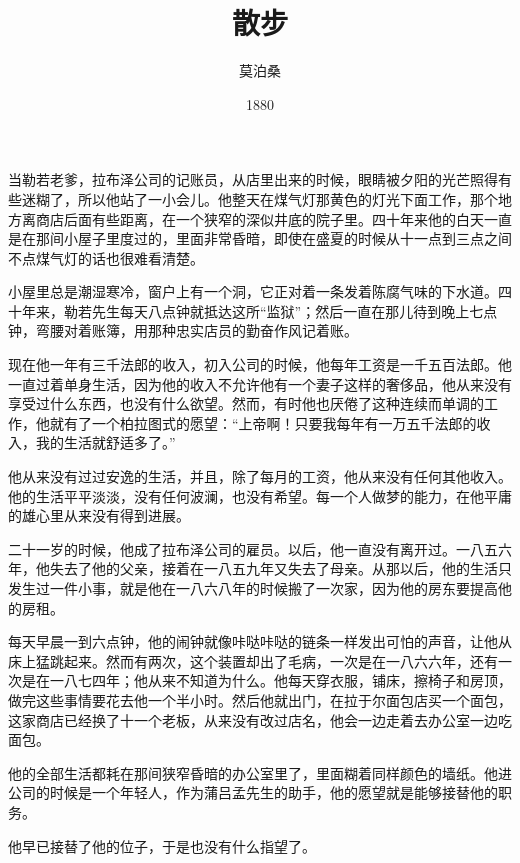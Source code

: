 \documentclass{article}
\title{散步}
\author{莫泊桑}
\date{1880}
\begin{document}



\Large

当勒若老爹，拉布泽公司的记账员，从店里出来的时候，眼睛被夕阳的光芒照得有些迷糊了，所以他站了一小会儿。他整天在煤气灯那黄色的灯光下面工作，那个地方离商店后面有些距离，在一个狭窄的深似井底的院子里。四十年来他的白天一直是在那间小屋子里度过的，里面非常昏暗，即使在盛夏的时候从十一点到三点之间不点煤气灯的话也很难看清楚。



小屋里总是潮湿寒冷，窗户上有一个洞，它正对着一条发着陈腐气味的下水道。四十年来，勒若先生每天八点钟就抵达这所“监狱”；然后一直在那儿待到晚上七点钟，弯腰对着账簿，用那种忠实店员的勤奋作风记着账。



现在他一年有三千法郎的收入，初入公司的时候，他每年工资是一千五百法郎。他一直过着单身生活，因为他的收入不允许他有一个妻子这样的奢侈品，他从来没有享受过什么东西，也没有什么欲望。然而，有时他也厌倦了这种连续而单调的工作，他就有了一个柏拉图式的愿望：“上帝啊！只要我每年有一万五千法郎的收入，我的生活就舒适多了。”



他从来没有过过安逸的生活，并且，除了每月的工资，他从来没有任何其他收入。他的生活平平淡淡，没有任何波澜，也没有希望。每一个人做梦的能力，在他平庸的雄心里从来没有得到进展。



二十一岁的时候，他成了拉布泽公司的雇员。以后，他一直没有离开过。一八五六年，他失去了他的父亲，接着在一八五九年又失去了母亲。从那以后，他的生活只发生过一件小事，就是他在一八六八年的时候搬了一次家，因为他的房东要提高他的房租。



每天早晨一到六点钟，他的闹钟就像咔哒咔哒的链条一样发出可怕的声音，让他从床上猛跳起来。然而有两次，这个装置却出了毛病，一次是在一八六六年，还有一次是在一八七四年；他从来不知道为什么。他每天穿衣服，铺床，擦椅子和房顶，做完这些事情要花去他一个半小时。然后他就出门，在拉于尔面包店买一个面包，这家商店已经换了十一个老板，从来没有改过店名，他会一边走着去办公室一边吃面包。



他的全部生活都耗在那间狭窄昏暗的办公室里了，里面糊着同样颜色的墙纸。他进公司的时候是一个年轻人，作为蒲吕孟先生的助手，他的愿望就是能够接替他的职务。



他早已接替了他的位子，于是也没有什么指望了。
\end{document}
